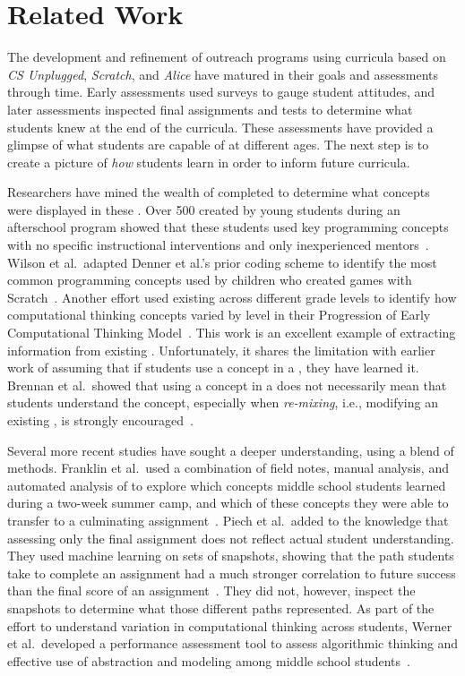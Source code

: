 \section{Related Work}
The development and refinement of outreach programs using curricula based on
\emph{CS Unplugged}, \emph{Scratch}, and \emph{Alice} have matured in their
goals and assessments through time. Early assessments used surveys to gauge
student attitudes, and later assessments inspected final assignments and tests
to determine what students knew at the end of the curricula. These assessments
have provided a glimpse of what students are capable of at different ages. The
next step is to create a picture of \emph{how} students learn in order to
inform future curricula.

Researchers have mined the wealth of completed  to determine what
concepts were displayed in these . Over 500  created by
young students during an afterschool program showed that these students used
key programming concepts with no specific instructional interventions and only
inexperienced mentors~\cite{Maloney:2008:PCU:1352135.1352260}. Wilson et
al.\ adapted Denner et al.'s prior coding scheme to identify the most common
programming concepts used by children who created games with
Scratch~\cite{Denner:2012:CGC:2072695.2073050, wilson12}. Another effort used
existing  across different grade levels to identify how
computational thinking concepts varied by level in their Progression of Early
Computational Thinking Model~\cite{Seiter:2013:MLP:2493394.2493403}. This work
is an excellent example of extracting information from existing
. Unfortunately, it shares the limitation with earlier work of
assuming that if students use a concept in a \sprogram{}, they have learned
it. Brennan et al.\ showed that using a concept in a \sprogram{} does not
necessarily mean that students understand the concept, especially when
\emph{re-mixing}, i.e., modifying an existing \sprogram{}, is strongly
encouraged~\cite{brennan12}.

Several more recent studies have sought a deeper understanding, using a blend
of methods. Franklin et al.\ used a combination of field notes, manual
analysis, and automated analysis of  to explore which concepts
middle school students learned during a two-week summer camp, and which of
these concepts they were able to transfer to a culminating
assignment~\cite{Boe:2013:HLS:2445196.2445265, Franklin:2013:SBO}. Piech et
al.\ added to the knowledge that assessing only the final assignment does not
reflect actual student understanding. They used machine learning on sets of
snapshots, showing that the path students take to complete an assignment had a
much stronger correlation to future success than the final score of an
assignment~\cite{Piech:2012:MSL:2157136.2157182}. They did not, however,
inspect the snapshots to determine what those different paths represented. As
part of the effort to understand variation in computational thinking across
students, Werner et al.\ developed a performance assessment tool to assess
algorithmic thinking and effective use of abstraction and modeling among middle
school students~\cite{Werner:2012:FPA:2157136.2157200}.

